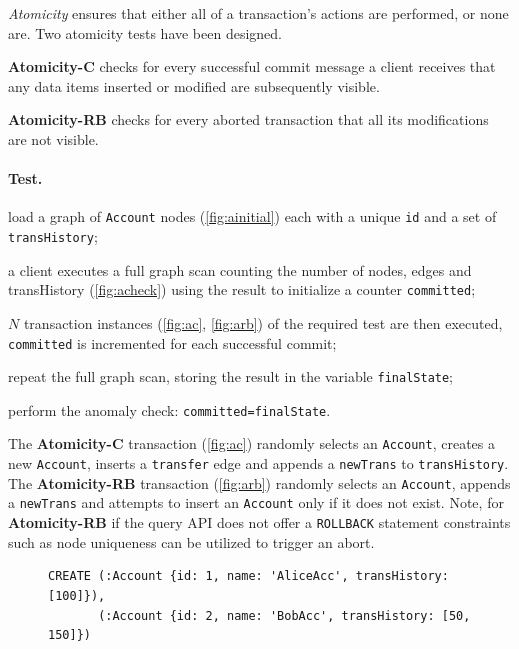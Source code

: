 \emph{Atomicity} ensures that either all of a transaction's actions are 
performed, or none are. Two atomicity tests have been designed.

{\flushleft \textbf{Atomicity-C}} checks for every successful commit message a
client receives that any data items inserted or modified are subsequently visible.

{\flushleft \textbf{Atomicity-RB}} checks for every aborted transaction that all
its modifications are not visible.

\paragraph{Test.}
\begin{enumerate*}[label={(\roman*)}]
  \item load a graph of \texttt{Account} nodes (\autoref{fig:ainitial}) each 
        with a unique \texttt{id} and a set of \texttt{transHistory};
  \item a client executes a full graph scan counting the number of nodes, edges
        and transHistory (\autoref{fig:acheck}) using the result to initialize a
        counter \texttt{committed};
  \item $N$ transaction instances (\autoref{fig:ac}, \autoref{fig:arb}) of the
        required test are then executed, \texttt{committed} is incremented for
        each successful commit;
  \item repeat the full graph scan, storing the result in the variable
        \texttt{finalState};
  \item perform the anomaly check: \texttt{committed=finalState}.
\end{enumerate*}

The \textbf{Atomicity-C} transaction (\autoref{fig:ac}) randomly selects an
\texttt{Account}, creates a new \texttt{Account}, inserts a \texttt{transfer} 
edge and appends a \texttt{newTrans} to \texttt{transHistory}. The \textbf{Atomicity-RB} 
transaction (\autoref{fig:arb}) randomly selects an \texttt{Account}, appends a 
\texttt{newTrans} and attempts to insert an \texttt{Account} only if it does
not exist. Note, for \textbf{Atomicity-RB} if the query API does not offer a
\texttt{ROLLBACK} statement constraints such as node uniqueness can be utilized
to trigger an abort.

\begin{figure}[htb]
\centering

\begin{lstlisting}[language=cypher,label=fig:ainitial,caption=Cypher query for creating initial data for the \tx{Atomicity} transactions.]
CREATE (:Account {id: 1, name: 'AliceAcc', transHistory: [100]}),
       (:Account {id: 2, name: 'BobAcc', transHistory: [50, 150]})
\end{lstlisting}

\end{figure}

